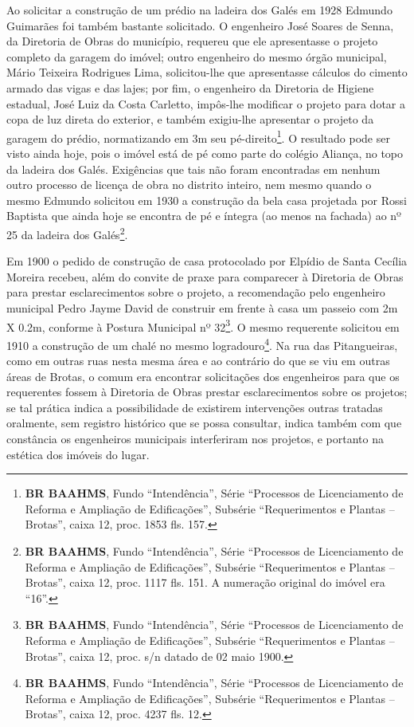 Ao solicitar a construção de um prédio na ladeira dos Galés em 1928 Edmundo Guimarães foi também bastante solicitado. O engenheiro José Soares de Senna, da Diretoria de Obras do município, requereu que ele apresentasse o projeto completo da garagem do imóvel; outro engenheiro do mesmo órgão municipal, Mário Teixeira Rodrigues Lima, solicitou-lhe que apresentasse cálculos do cimento armado das vigas e das lajes; por fim, o engenheiro da Diretoria de Higiene estadual, José Luiz da Costa Carletto, impôs-lhe modificar o projeto para dotar a copa de luz direta do exterior, e também exigiu-lhe apresentar o projeto da garagem do prédio, normatizando em 3m seu pé-direito\footnote{\textbf{BR BAAHMS}, Fundo ``Intendência'', Série ``Processos de Licenciamento de Reforma e Ampliação de Edificações'', Subsérie ``Requerimentos e Plantas -- Brotas'', caixa 12, proc. 1853 fls. 157.}. O resultado pode ser visto ainda hoje, pois o imóvel está de pé como parte do colégio Aliança, no topo da ladeira dos Galés. Exigências que tais não foram encontradas em nenhum outro processo de licença de obra no distrito inteiro, nem mesmo quando o mesmo Edmundo solicitou em 1930 a construção da bela casa projetada por Rossi Baptista que ainda hoje se encontra de pé e íntegra (ao menos na fachada) ao nº 25 da ladeira dos Galés\footnote{\textbf{BR BAAHMS}, Fundo ``Intendência'', Série ``Processos de Licenciamento de Reforma e Ampliação de Edificações'', Subsérie ``Requerimentos e Plantas -- Brotas'', caixa 12, proc. 1117 fls. 151. A numeração original do imóvel era ``16''.}.

Em 1900 o pedido de construção de casa protocolado por Elpídio de Santa Cecília Moreira recebeu, além do convite de praxe para comparecer à Diretoria de Obras para prestar esclarecimentos sobre o projeto, a recomendação pelo engenheiro municipal Pedro Jayme David de construir em frente à casa um passeio com 2m X 0.2m, conforme à Postura Municipal nº 32\footnote{\textbf{BR BAAHMS}, Fundo ``Intendência'', Série ``Processos de Licenciamento de Reforma e Ampliação de Edificações'', Subsérie ``Requerimentos e Plantas -- Brotas'', caixa 12, proc. s/n datado de 02 maio 1900.}. O mesmo requerente solicitou em 1910 a construção de um chalé no mesmo logradouro\footnote{\textbf{BR BAAHMS}, Fundo ``Intendência'', Série ``Processos de Licenciamento de Reforma e Ampliação de Edificações'', Subsérie ``Requerimentos e Plantas -- Brotas'', caixa 12, proc. 4237 fls. 12.}. Na rua das Pitangueiras, como em outras ruas nesta mesma área e ao contrário do que se viu em outras áreas de Brotas, o comum era encontrar solicitações dos engenheiros para que os requerentes fossem à Diretoria de Obras prestar esclarecimentos sobre os projetos; se tal prática indica a possibilidade de existirem intervenções outras tratadas oralmente, sem registro histórico que se possa consultar, indica também com que constância os engenheiros municipais interferiram nos projetos, e portanto na estética dos imóveis do lugar.

